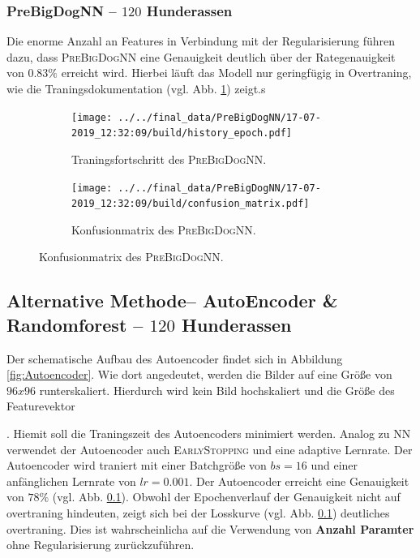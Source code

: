 \subsubsection{PreBigDogNN -- $120$ Hunderassen}
Die enorme Anzahl an Features in Verbindung mit der Regularisierung führen dazu,
dass \textsc{PreBigDogNN} eine Genauigkeit deutlich über der Rategenauigkeit
von $0.83\%$ erreicht wird. Hierbei läuft das Modell nur geringfügig in Overtraning,
wie die Traningsdokumentation (vgl. Abb. \ref{fig:PreBigDogNN_Loss_Acc}) zeigt.s
\begin{figure}
\centering
\begin{subfigure}{0.48\textwidth}
\centering
\texttt{[image: ../../final\_data/PreBigDogNN/17-07-2019\_12:32:09/build/history\_epoch.pdf]}
\caption{Traningsfortschritt des \textsc{PreBigDogNN}.}
\label{fig:PreBigDogNN_Loss_Acc}
\end{subfigure}
\begin{subfigure}{0.48\textwidth}
\centering
\texttt{[image: ../../final\_data/PreBigDogNN/17-07-2019\_12:32:09/build/confusion\_matrix.pdf]}
\caption{Konfusionmatrix des \textsc{PreBigDogNN}.}
\label{fig:PreBigDogNN_Konfusionmatrix}
\end{subfigure}
\end{figure}

\subsection{Alternative Methode-- AutoEncoder \& Randomforest -- $120$ Hunderassen}
Der schematische Aufbau des Autoencoder findet sich in Abbildung \ref{fig:Autoencoder}.
Wie dort angedeutet, werden die Bilder auf eine Größe von $96x96$ runterskaliert.
Hierdurch wird kein Bild hochskaliert und die Größe des Featurevektor


. Hiemit soll die Traningszeit des Autoencoders
minimiert werden. Analog zu NN verwendet der Autoencoder auch \textsc{EarlyStopping}
und eine adaptive Lernrate. Der Autoencoder wird traniert mit einer Batchgröße
von $bs=16$ und einer anfänglichen Lernrate von $lr=0.001$. Der Autoencoder
erreicht eine Genauigkeit von $78\%$ (vgl. Abb. \ref{}). Obwohl der Epochenverlauf
der Genauigkeit nicht auf overtraning hindeuten, zeigt sich bei der Losskurve
(vgl. Abb. \ref{}) deutliches overtraning. Dies ist wahrscheinlicha auf die
Verwendung von \textbf{Anzahl Paramter} ohne Regularisierung zurückzuführen.

